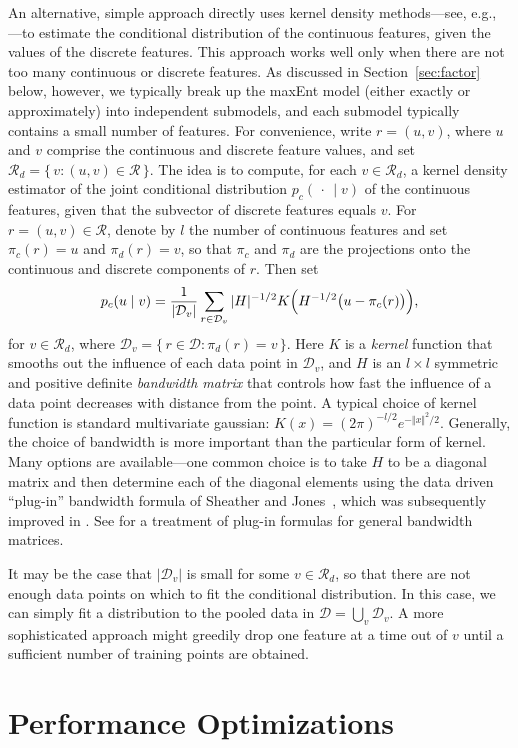 \documentclass[11pt]{article}
\newcommand{\xD}{\mathcal{D}}
\newcommand{\xR}{\mathcal{R}}
\newcommand{\darg}{\,\cdot\,}
\begin{document}
An alternative, simple approach directly uses kernel density methods---see, e.g., \cite{Scott92}---to estimate the conditional distribution of the continuous features, given the values of the discrete features. This approach works well only when there are not too many continuous or discrete features. As discussed in Section~\ref{sec:factor} below, however, we typically break up the maxEnt model (either exactly or approximately) into independent submodels, and each submodel typically contains a small number of features. For convenience, write $r=(u,v)$, where $u$ and $v$ comprise the continuous and discrete feature values, and set $\xR_d=\{\,v:(u,v)\in\xR\,\}$. The idea is to compute, for each $v\in\xR_d$, a kernel density estimator of the joint conditional distribution $p_c(\darg\mid v)$ of the continuous features, given that the subvector of discrete features equals $v$. For $r=(u,v)\in\xR$, denote by $l$ the number of continuous features and set $\pi_c(r)=u$ and $\pi_d(r)=v$, so that $\pi_c$ and $\pi_d$ are the projections onto the continuous and discrete components of $r$. Then set 
\[
p_c(u\mid v)=\frac{1}{|\xD_v|}\sum_{r\in\xD_v}|H|^{-1/2}K\Bigl(H^{-1/2}\bigl(u-\pi_c(r)\bigr)\Bigr),
\]
for $v\in\xR_d$, where $\xD_v=\{\,r\in\xD:\pi_d(r)=v\,\}$. Here $K$ is a \emph{kernel} function that smooths out the influence of each data point in $\xD_v$, and $H$ is an $l\times l$ symmetric and positive definite \emph{bandwidth matrix} that controls how fast the influence of a data point decreases with distance from the point. A typical choice of kernel function is standard multivariate gaussian: $K(x)=(2\pi)^{-l/2}e^{-\Vert x\Vert^2/2}$. Generally, the choice of bandwidth is more important than the particular form of kernel. Many options are available---one common choice is to take $H$ to be a diagonal matrix and then determine each of the diagonal elements using the data driven ``plug-in'' bandwidth formula of Sheather and Jones~\cite{SheatherJ91}, which was subsequently improved in \cite{LiaoWL10}. See \cite{WandJ94} for a treatment of plug-in formulas for general bandwidth matrices.

It may be the case that $|\xD_v|$ is small for some $v\in\xR_d$, so that there are not enough data points on which to fit the conditional distribution. In this case, we can simply fit a distribution to the pooled data in $\xD=\bigcup_v\xD_v$. A more sophisticated approach might greedily drop one feature at a time out of $v$ until a sufficient number of training points are obtained.

\section{Performance Optimizations}
\end{document}
